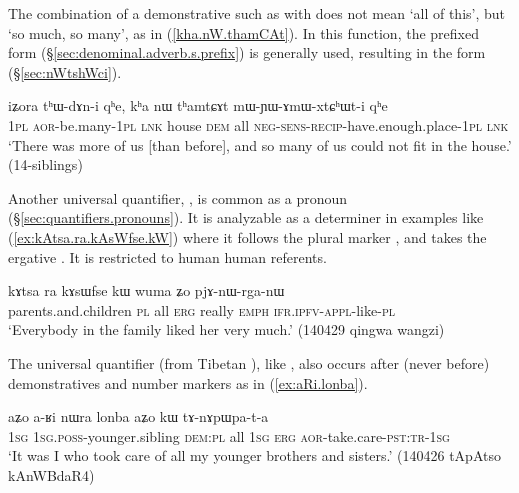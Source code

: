 The combination of a demonstrative such as  with   does not mean `all of this', but `so much, so many', as in (\ref{kha.nW.thamCAt}). In this function, the prefixed form  (§\ref{sec:denominal.adverb.s.prefix}) is generally used, resulting in the form  (§\ref{sec:nWtshWci}).

 
\begin{exe}
\ex \label{kha.nW.thamCAt}
 \gll iʑora tʰɯ-dɤn-i qʰe, kʰa nɯ tʰamtɕɤt mɯ-ɲɯ-ɤmɯ-xtɕʰɯt-i qʰe \\ 
 \textsc{1pl} \textsc{aor}-be.many-\textsc{1pl} \textsc{lnk} house \textsc{dem} all \textsc{neg}-\textsc{sens}-\textsc{recip}-have.enough.place-\textsc{1pl} \textsc{lnk} \\
 \glt `There was more of us [than before], and so many of us could not fit in the house.' (14-siblings) 
 \end{exe}
 
 Another universal quantifier,  , is common as a pronoun (§\ref{sec:quantifiers.pronouns}). It is analyzable as a determiner in examples like  (\ref{ex:kAtsa.ra.kAsWfse.kW}) where it follows the plural marker , and takes the ergative .  It is restricted to human human referents.
 
 \begin{exe}
\ex \label{ex:kAtsa.ra.kAsWfse.kW}
\gll  kɤtsa ra kɤsɯfse kɯ wuma ʑo pjɤ-nɯ-rga-nɯ  \\
parents.and.children \textsc{pl} all \textsc{erg} really \textsc{emph} \textsc{ifr}.\textsc{ipfv}-\textsc{appl}-like-\textsc{pl} \\
\glt `Everybody in the family liked her very much.' (140429 qingwa wangzi) 
  \end{exe}

The universal quantifier  (from Tibetan ), like , also occurs after (never before) demonstratives and number markers as in (\ref{ex:aRi.lonba}).

 \begin{exe}
\ex \label{ex:aRi.lonba}
 \gll aʑo a-ʁi nɯra lonba aʑo kɯ tɤ-nɤpɯpa-t-a \\
 \textsc{1sg} \textsc{1sg}.\textsc{poss}-younger.sibling \textsc{dem}:\textsc{pl} all \textsc{1sg} \textsc{erg} \textsc{aor}-take.care-\textsc{pst}:\textsc{tr}-\textsc{1sg} \\
 \glt `It was I who took care of all my younger brothers and sisters.' (140426 tApAtso kAnWBdaR4)
\end{exe}
 

